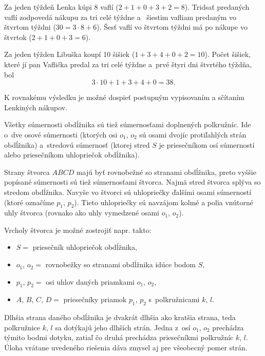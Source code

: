 {%
Za jeden týždeň Lenka kúpi 8 vaflí ($2+1+0+3+2=8$).
Tridsať predaných vaflí zodpovedá nákupu za tri celé týždne a ~šiestim vafliam predaným vo štvrtom týždni ($30=3\cdot8+6$).
Šesť vaflí vo štvrtom týždni má po nákupe vo štvrtok ($2+1+0+3=6$).

Za jeden týžden Libuška koupí 10 šišiek ($1+3+4+0+2=10$).
Počet šišiek, které jí pan Vaflička predal za tri celé týždne a~prvé štyri dni štvrtého týždňa, bol
$$
3\cdot10+1+3+4+0 =38.
$$

\poznamka
K rovnakému výsledku je možné dospieť postupným vypisovaním a sčítaním Lenkiných nákupov.
}

{%
Všetky súmernosti obdĺžnika sú tiež súmernosťami doplnených polkružníc.
Ide o~dve osové súmernosti (ktorých osi $o_1$, $o_2$ sú osami dvojíc protiľahlých strán obdĺžnika) a~stredovú súmernosť (ktorej stred $S$ je priesečníkom osí súmerností alebo priesečníkom uhlopriečok obdĺžnika).
%

Strany štvorca $ABCD$ majú byť rovnobežné so stranami obdĺžnika, preto vyššie popísané súmernosti sú tiež súmernosťami štvorca.
Najmä stred štvorca splýva so stredom obdĺžnika.
Navyše vo štvorci sú uhlopriečky ďalšími osami súmerností (ktoré označíme $p_1$, $p_2$).
Tieto uhlopriečky sú navzájom kolmé a polia vnútorné uhly štvorca (rovnako ako uhly vymedzené osami $o_1$, $o_2$).
%

Vrcholy štvorca je možné zostrojiť napr. takto:
\begin{itemize}
\parindent
  \item $S =$ priesečník uhlopriečok obdĺžnika,
  \item $o_1$, $o_2 =$ rovnobežky so stranami obdĺžnika idúce bodom $S$,
  \item $p_1$, $p_2 =$ osi uhlov daných priamkami $o_1$, $o_2$,
  \item $A$, $B$, $C$, $D =$ priesečníky priamok $p_1$, $p_2$ s~polkružnicami $k$, $l$.
\end{itemize}

\poznamky
Dlhšia strana daného obdĺžnika je dvakrát dlhšia ako kratšia strana, teda polkružnice $k$, $l$ sa dotýkajú jeho dlhších strán.
Jedna z~osí $o_1$, $o_2$ prechádza týmito bodmi dotyku, zatiaľ čo druhá prechádza priesečníkmi polkružníc $k$, $l$.
Úloha vrátane uvedeného riešenia dáva zmysel aj pre všeobecný pomer strán.
}

